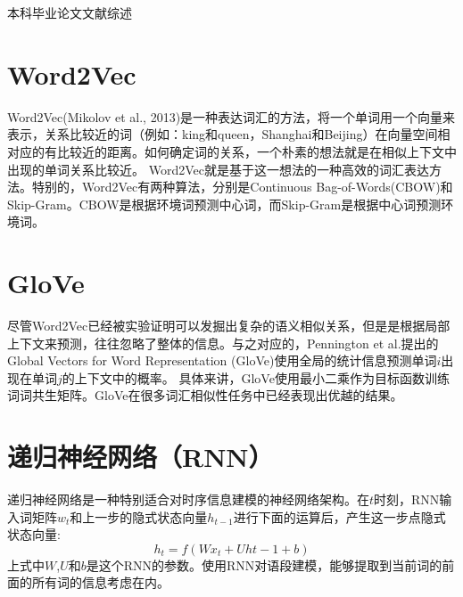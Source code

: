{\sanhao\heiti\filcenter \centerline{本科毕业论文文献综述}}

\section{Word2Vec}
Word2Vec(Mikolov et al., 2013\cite{mikolov2013efficient})是一种表达词汇的方法，将一个单词用一个向量来表示，关系比较近的词（例如：king和queen，Shanghai和Beijing）在向量空间相对应的有比较近的距离。如何确定词的关系，一个朴素的想法就是在相似上下文中出现的单词关系比较近。
Word2Vec就是基于这一想法的一种高效的词汇表达方法。特别的，Word2Vec有两种算法，分别是Continuous Bag-of-Words(CBOW)和Skip-Gram。CBOW是根据环境词预测中心词，而Skip-Gram是根据中心词预测环境词。\\
\section{GloVe}
尽管Word2Vec已经被实验证明可以发掘出复杂的语义相似关系，但是是根据局部上下文来预测，往往忽略了整体的信息。与之对应的，Pennington et al.\cite{pennington2014glove}提出的Global Vectors for Word Representation (GloVe)使用全局的统计信息预测单词$i$出现在单词$j$的上下文中的概率。
具体来讲，GloVe使用最小二乘作为目标函数训练词词共生矩阵。GloVe在很多词汇相似性任务中已经表现出优越的结果。\\
\section{递归神经网络（RNN）}
递归神经网络是一种特别适合对时序信息建模的神经网络架构。在$t$时刻，RNN输入词矩阵$w_t$和上一步的隐式状态向量$h_{t-1}$进行下面的运算后，产生这一步点隐式状态向量:\\
\begin{equation}
h_t = f(Wx_t+Uh{t-1}+b)
\end{equation}
上式中$W$,$U$和$b$是这个RNN的参数。使用RNN对语段建模，能够提取到当前词的前面的所有词的信息考虑在内。
